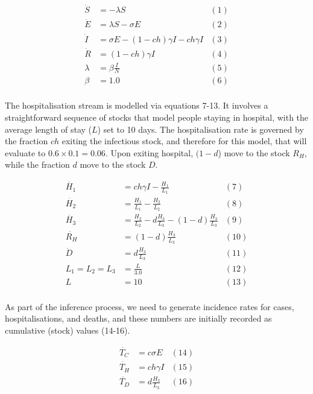 \documentclass[10pt,letterpaper]{article}
\begin{document}
\begin{align*}
\dot{S}      & = - \lambda S & (1) \\
\dot{E}      & =  \lambda S - \sigma E & (2) \\
\dot{I}      & =   \sigma E - (1-ch)\gamma I - ch\gamma I& (3) \\
\dot{R}      & =   (1-ch)\gamma I& (4) \\
\lambda      & = \beta\frac{I}{N} & (5) \\
\beta        & = 1.0 & (6) \\
\end{align*}

The hospitalisation stream is modelled via equations 7-13. It involves a straightforward sequence of stocks that model people staying in hospital, with the average length of stay (\(L\)) set to 10 days. The hospitalisation rate is governed by the fraction \(ch\) exiting the infectious stock, and therefore for this model, that will evaluate to \(0.6 \times 0.1=0.06\). Upon exiting hospital, \((1-d\)) move to the stock \(R_{H}\), while the fraction \(d\) move to the stock \(D\).

\begin{align*}
\dot{H_{1}}  & =   ch\gamma I - \frac{H_{1}}{L_{1}}& (7) \\
\dot{H_{2}}  & =   \frac{H_{1}}{L_{1}} - \frac{H_{2}}{L_{2}} & (8) \\
\dot{H_{3}}  & =   \frac{H_{2}}{L_{2}} - d\frac{H_{3}}{L_{3}} - (1-d)\frac{H_{3}}{L_{3}}& (9) \\
\dot{R_{H}}  & =   (1-d)\frac{H_{3}}{L_{3}}& (10) \\
\dot{D}      & =   d\frac{H_{3}}{L_{3}}   & (11) \\
L_{1} = L_{2} = L_{3}     & = \frac{L}{3.0} & (12) \\
L            & = 10 & (13) \\
\end{align*}

As part of the inference process, we need to generate incidence rates for cases, hospitalisations, and deaths, and these numbers are initially recorded as cumulative (stock) values (14-16).

\begin{align*}
\dot{T_{C}}  & =  c\sigma E & (14) \\
\dot{T_{H}}  & =  ch\gamma I & (15) \\
\dot{T_{D}}  & =  d\frac{H_{3}}{L_{3}} &(16) \\
\end{align*}
\end{document}
